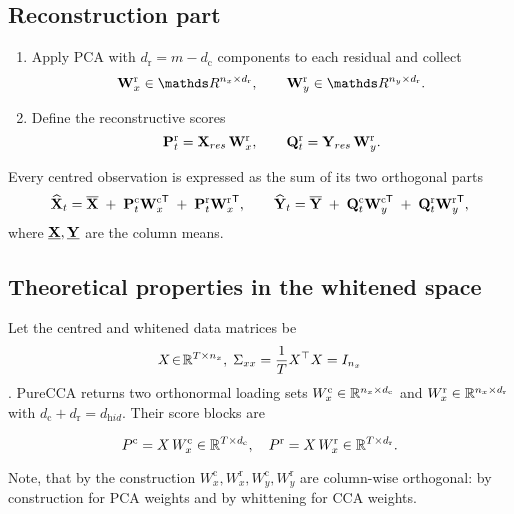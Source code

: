 \documentclass[14pt]{extarticle}
\begin{document}
	\subsection*{Reconstruction part}

	\begin{enumerate}[leftmargin=1.4cm,label=(R\arabic*)]
		\item
		Apply PCA with \(d_{\mathrm r}=m-d_{\mathrm c}\) components to each
		residual and collect
		\[
		\bW_x^{\mathrm r}\in\dR^{n_x\times d_{\mathrm r}},
		\qquad
		\bW_y^{\mathrm r}\in\dR^{n_y\times d_{\mathrm r}}.
		\]
		\item
		Define the reconstructive scores
		\[
		\mathbf{P}_t^{\mathrm r}= \mathbf{X}_{res}\,\mathbf{W}_x^{\mathrm r},
		\qquad
		\mathbf{Q}_t^{\mathrm r}= \mathbf{Y}_{res}\,\mathbf{W}_y^{\mathrm r}.
		\]
	\end{enumerate}
	
	
	Every centred observation is expressed as the sum of its two
	orthogonal parts
	\[
	\widehat{\mathbf{X}}_t
	=\overline{\mathbf{X}}
	\;+\;
	\mathbf{P}_t^{\mathrm c}{\mathbf{W}_x^{\mathrm c}}^{\!\mathsf T}
	\;+\;
	\mathbf{P}_t^{\mathrm r}{\mathbf{W}_x^{\mathrm r}}^{\!\mathsf T},
	\qquad
	\widehat{\mathbf{Y}}_t
	=\overline{\mathbf{Y}}
	\;+\;
	\mathbf{Q}_t^{\mathrm c}{\mathbf{W}_y^{\mathrm c}}^{\!\mathsf T}
	\;+\;
	\mathbf{Q}_t^{\mathrm r}{\mathbf{W}_y^{\mathrm r}}^{\!\mathsf T},
	\]
	where \(\underline{\mathbf{X}},\underline{\mathbf{Y}}\) are the column means.
	
	\subsection*{Theoretical properties in the whitened space}
	Let the centred and whitened data matrices be
	\[
	X\!\in\!\mathbb{R}^{T\times n_x},\;
	\Sigma_{xx}=\frac{1}{T}X^{\top}X = I_{n_x}
	\].
	PureCCA returns two orthonormal loading sets  
	\(W_x^{\mathrm c}\in\mathbb{R}^{n_x\times d_{\mathrm c}}\)  
	and \(W_x^{\mathrm r}\in\mathbb{R}^{n_x\times d_{\mathrm r}}\)
	with \(d_{\mathrm c}+d_{\mathrm r}=d_{\mathrm hid}\).
	Their score blocks are
	
	\[
	P^{\mathrm c}=X\,W_x^{\mathrm c}\in\mathbb{R}^{T\times d_{\mathrm c}},
	\quad
	P^{\mathrm r}=X\,W_x^{\mathrm r}\in\mathbb{R}^{T\times d_{\mathrm r}}.
	\]
	
	Note, that by the construction $W_x^{\mathrm c}, W_x^{\mathrm r}, W_y^{\mathrm c}, W_y^{\mathrm r}$ are column-wise orthogonal: by construction for PCA weights and by whittening for CCA weights.
	
\end{document}
